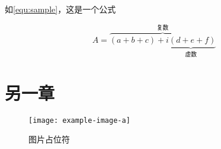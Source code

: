\par 如\autoref{equ:sample}，这是一个公式

\begin{equation}
    \label{equ:sample}
    A=\overbrace{(a+b+c)+\underbrace{i(d+e+f)}_{\text{虚数}}}^{\text{复数}}
\end{equation}

\chapter{另一章}


\begin{figure}[htbp]
    \centering
    \texttt{[image: example-image-a]}
    \caption{\label{fig:fig-placeholder}图片占位符}
\end{figure}